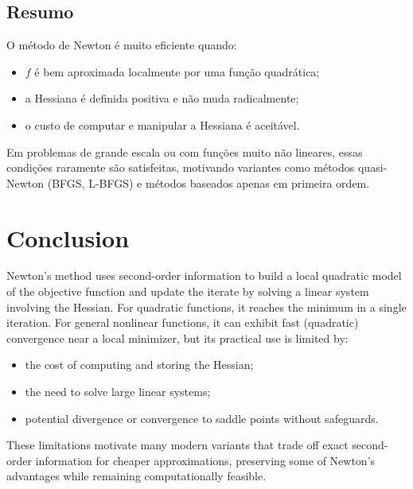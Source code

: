 \documentclass[9pt,a4paper]{extarticle}
\begin{document}
\subsection*{Resumo}

O método de Newton é muito eficiente quando:
\begin{itemize}
    \item $f$ é bem aproximada localmente por uma função quadrática;
    \item a Hessiana é definida positiva e não muda radicalmente;
    \item o custo de computar e manipular a Hessiana é aceitável.
\end{itemize}

Em problemas de grande escala ou com funções muito não lineares, essas condições
raramente são satisfeitas, motivando variantes como métodos quasi-Newton
(BFGS, L-BFGS) e métodos baseados apenas em primeira ordem.

\section{Conclusion}

Newton's method uses second-order information to build a local quadratic model
of the objective function and update the iterate by solving a linear system
involving the Hessian. For quadratic functions, it reaches the minimum in a single
iteration. For general nonlinear functions, it can exhibit fast (quadratic)
convergence near a local minimizer, but its practical use is limited by:
\begin{itemize}
    \item the cost of computing and storing the Hessian;
    \item the need to solve large linear systems;
    \item potential divergence or convergence to saddle points without safeguards.
\end{itemize}

These limitations motivate many modern variants that trade off exact second-order
information for cheaper approximations, preserving some of Newton's advantages
while remaining computationally feasible.
\end{document}
